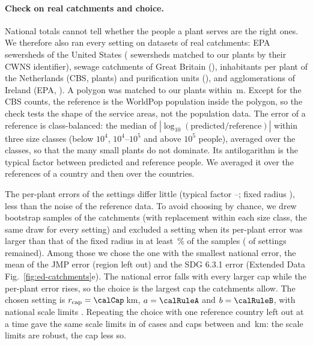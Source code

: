 \paragraph{Check on real catchments and choice.} National totals cannot tell whether the people a
plant serves are the right ones. We therefore also ran every setting on datasets of real catchments:
EPA sewersheds of the United States (\calUnitsUsSewersheds{} sewersheds matched to our plants by their
CWNS identifier)\cite{epa_sewersheds}, sewage catchments of Great Britain
(\calUnitsGbCatchments)\cite{gb_catchments}, inhabitants per plant of the Netherlands (CBS,
\calUnitsNlCbs{} plants)\cite{cbs_rwzi} and purification units (\calUnitsNlUnits)\cite{nl_units}, and
agglomerations of Ireland (EPA, \calUnitsIeAgglomerations)\cite{ie_agglomerations}. A polygon was
matched to our plants within \calMatchDistance\,m. Except for the CBS counts, the reference is the
WorldPop population inside the polygon, so the check tests the shape of the service areas, not the
population data. The error of a reference is class-balanced: the median of
$|\log_{10}(\text{predicted}/\text{reference})|$ within three size classes (below $10^4$, $10^4$--$10^5$
and above $10^5$ people), averaged over the classes, so that the many small plants do not dominate.
Its antilogarithm is the typical factor between predicted and reference people. We averaged it over the
references of a country and then over the countries.

The per-plant errors of the \calConfigurations{} settings differ little (typical factor
\calPlantErrLow--\calPlantErrHigh; fixed radius \calPlantErrFixed), less than the noise of the
reference data. To avoid choosing by chance, we drew \calBootstrapSamples{} bootstrap samples of the
catchments (with replacement within each size class, the same draw for every setting) and excluded a
setting when its per-plant error was larger than that of the fixed radius in at least \calConfidence\,\%
of the samples (\calAllowedConfigurations{} of \calConfigurations{} settings remained). Among those we
chose the one with the smallest national error, the mean of the JMP error (region left out) and the
SDG 6.3.1 error (Extended Data Fig.~\ref{fig:ed-catchments}e). The national error falls with every
larger cap while the per-plant error rises, so the choice is the largest cap the catchments allow. The
chosen setting is $r_{\mathrm{cap}}=\calCap$\,km, $a=\calRuleA$ and $b=\calRuleB$, with national
scale limits \calScaleChosen. Repeating the choice with one reference country left out at a time gave
the same scale limits in \calLeaveOneOutSameLimits{} of \calLeaveOneOutRuns{} cases and caps between
\calLeaveOneOutCapLow{} and \calLeaveOneOutCapHigh\,km: the scale limits are robust, the cap less so.

